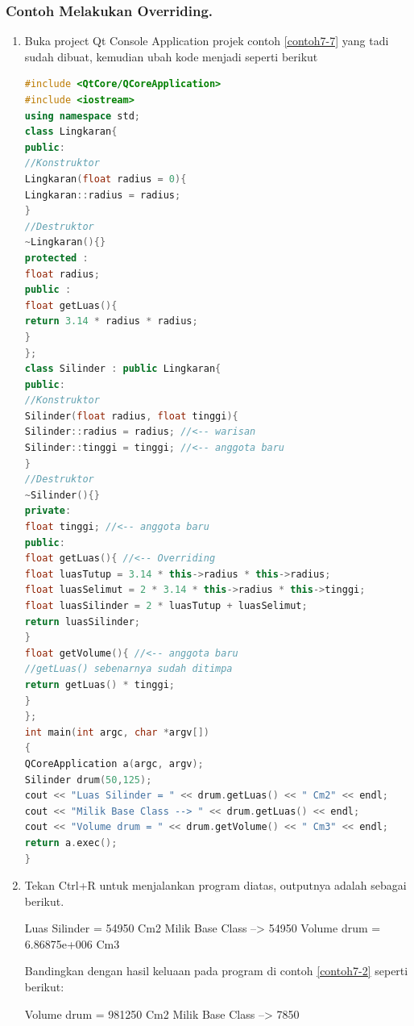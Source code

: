 \subsubsection*{Contoh Melakukan Overriding.}
\begin{enumerate}
	
	
	\item Buka project Qt Console Application projek contoh \ref{contoh7-7} yang tadi sudah
	dibuat, kemudian ubah kode menjadi seperti berikut
	
\begin{lstlisting}[language=c++, caption=Melakukan Overriding, label=contoh7-7]
#include <QtCore/QCoreApplication>
#include <iostream>
using namespace std;
class Lingkaran{
public:
//Konstruktor
Lingkaran(float radius = 0){
Lingkaran::radius = radius;
}
//Destruktor
~Lingkaran(){}
protected :
float radius;
public :
float getLuas(){
return 3.14 * radius * radius;
}
};
class Silinder : public Lingkaran{
public:
//Konstruktor
Silinder(float radius, float tinggi){
Silinder::radius = radius; //<-- warisan
Silinder::tinggi = tinggi; //<-- anggota baru
}
//Destruktor
~Silinder(){}
private:
float tinggi; //<-- anggota baru
public:
float getLuas(){ //<-- Overriding
float luasTutup = 3.14 * this->radius * this->radius;
float luasSelimut = 2 * 3.14 * this->radius * this->tinggi;
float luasSilinder = 2 * luasTutup + luasSelimut;
return luasSilinder;
}
float getVolume(){ //<-- anggota baru
//getLuas() sebenarnya sudah ditimpa
return getLuas() * tinggi;
}
};
int main(int argc, char *argv[])
{
QCoreApplication a(argc, argv);
Silinder drum(50,125);
cout << "Luas Silinder = " << drum.getLuas() << " Cm2" << endl;
cout << "Milik Base Class --> " << drum.getLuas() << endl;
cout << "Volume drum = " << drum.getVolume() << " Cm3" << endl;
return a.exec();
}
\end{lstlisting}
	
	
		\item
		Tekan Ctrl+R untuk menjalankan program diatas, outputnya adalah
		sebagai berikut.

	
	\begin{lcverbatim}
Luas Silinder = 54950 Cm2
Milik Base Class --> 54950
Volume drum = 6.86875e+006 Cm3
	\end{lcverbatim}
	
	Bandingkan dengan hasil keluaan pada program di contoh \ref{contoh7-2} 
  seperti berikut:
	
	\begin{lcverbatim}
Volume drum = 981250 Cm2
Milik Base Class –> 7850
	\end{lcverbatim}
\end{enumerate}


